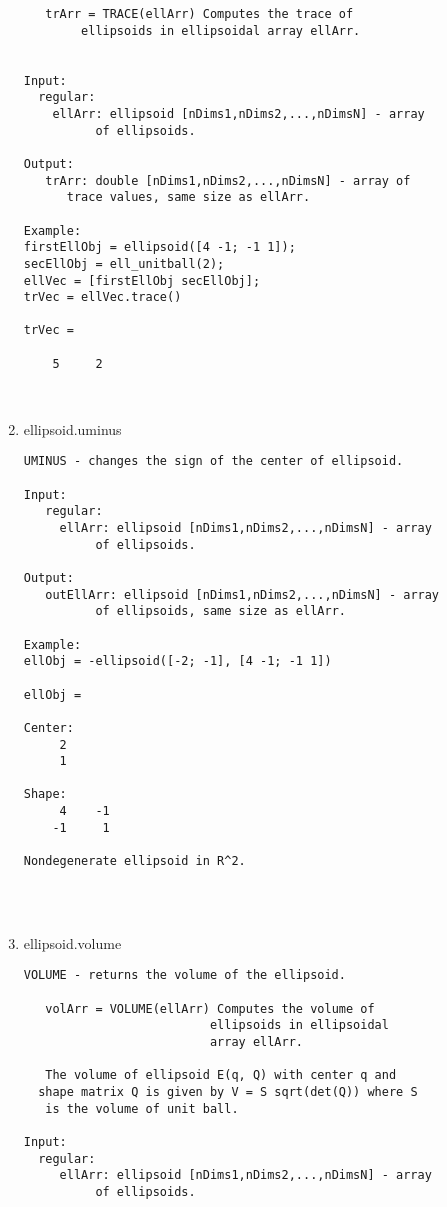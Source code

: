 \begin{enumerate}
\begin{lstlisting}
   trArr = TRACE(ellArr) Computes the trace of
        ellipsoids in ellipsoidal array ellArr.


Input:
  regular:
    ellArr: ellipsoid [nDims1,nDims2,...,nDimsN] - array
          of ellipsoids.

Output:
   trArr: double [nDims1,nDims2,...,nDimsN] - array of
      trace values, same size as ellArr.

Example:
firstEllObj = ellipsoid([4 -1; -1 1]);
secEllObj = ell_unitball(2);
ellVec = [firstEllObj secEllObj];
trVec = ellVec.trace()

trVec =

    5     2



\end{lstlisting}
\fontfamily{\familydefault}
\selectfont
\item {ellipsoid.uminus}
\selectfont
\begin{lstlisting}
UMINUS - changes the sign of the center of ellipsoid.

Input:
   regular:
     ellArr: ellipsoid [nDims1,nDims2,...,nDimsN] - array
          of ellipsoids.

Output:
   outEllArr: ellipsoid [nDims1,nDims2,...,nDimsN] - array
          of ellipsoids, same size as ellArr.

Example:
ellObj = -ellipsoid([-2; -1], [4 -1; -1 1])

ellObj =

Center:
     2
     1

Shape:
     4    -1
    -1     1

Nondegenerate ellipsoid in R^2.




\end{lstlisting}
\fontfamily{\familydefault}
\selectfont
\item {ellipsoid.volume}
\selectfont
\begin{lstlisting}
VOLUME - returns the volume of the ellipsoid.

   volArr = VOLUME(ellArr) Computes the volume of
                          ellipsoids in ellipsoidal
                          array ellArr.

   The volume of ellipsoid E(q, Q) with center q and
  shape matrix Q is given by V = S sqrt(det(Q)) where S
   is the volume of unit ball.

Input:
  regular:
     ellArr: ellipsoid [nDims1,nDims2,...,nDimsN] - array
          of ellipsoids.


\end{lstlisting}
\end{enumerate}
